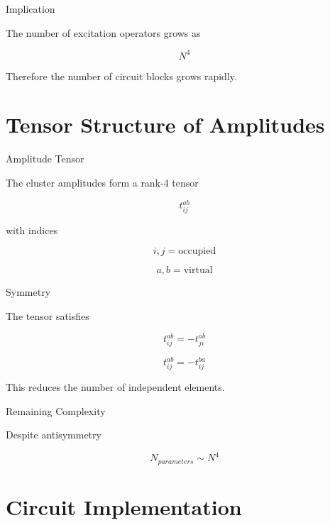 \documentclass{beamer}
\begin{document}
\begin{frame}{Implication}

  The number of excitation operators grows as

  \[
  N^4
  \]

  Therefore the number of circuit blocks grows rapidly.

\end{frame}

\section{Tensor Structure of Amplitudes}

\begin{frame}{Amplitude Tensor}

  The cluster amplitudes form a rank-4 tensor

  \[
  t_{ij}^{ab}
  \]

  with indices

  \[
  i,j = \text{occupied}
  \]

  \[
  a,b = \text{virtual}
  \]

\end{frame}

\begin{frame}{Symmetry}

  The tensor satisfies

  \[
  t_{ij}^{ab} = -t_{ji}^{ab}
  \]

  \[
  t_{ij}^{ab} = -t_{ij}^{ba}
  \]

  This reduces the number of independent elements.

\end{frame}

\begin{frame}{Remaining Complexity}

  Despite antisymmetry

  \[
  N_{parameters} \sim N^4
  \]

\end{frame}

\section{Circuit Implementation}
\end{document}
